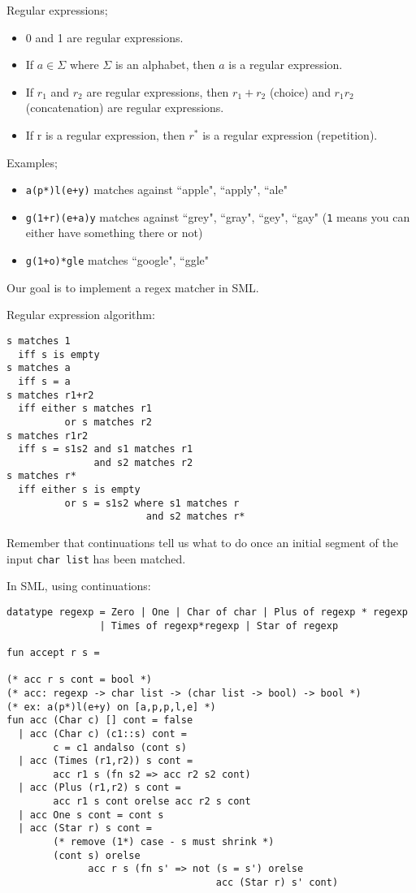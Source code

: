 \documentclass[11pt]{article}
\begin{document}
Regular expressions;
\begin{itemize}
    \item 0 and 1 are regular expressions.
    \item If $a \in \Sigma$ where $\Sigma$ is an alphabet, then $a$ is a regular expression.
    \item If $r_1$ and $r_2$ are regular expressions, then $r_1 + r_2$ (choice) and $r_{1}r_{2}$ (concatenation) are regular expressions.
    \item If r is a regular expression, then $r^*$ is a regular expression (repetition).
\end{itemize}

Examples;
\begin{itemize}
    \item \verb~a(p*)l(e+y)~ matches against ``apple", ``apply", ``ale"
    \item \verb~g(1+r)(e+a)y~ matches against ``grey", ``gray", ``gey", ``gay" (\verb~1~ means you can either have something there or not)
    \item \verb~g(1+o)*gle~ matches ``google", ``ggle"
\end{itemize}

Our goal is to implement a regex matcher in SML.

Regular expression algorithm:
\begin{verbatim}
s matches 1
  iff s is empty
s matches a
  iff s = a
s matches r1+r2
  iff either s matches r1
          or s matches r2
s matches r1r2
  iff s = s1s2 and s1 matches r1
               and s2 matches r2
s matches r*
  iff either s is empty
          or s = s1s2 where s1 matches r
                        and s2 matches r*
\end{verbatim}

Remember that continuations tell us what to do once an initial segment of the input \verb~char list~ has been matched.

In SML, using continuations:
\begin{verbatim}
datatype regexp = Zero | One | Char of char | Plus of regexp * regexp
                | Times of regexp*regexp | Star of regexp

fun accept r s = 

(* acc r s cont = bool *)
(* acc: regexp -> char list -> (char list -> bool) -> bool *)
(* ex: a(p*)l(e+y) on [a,p,p,l,e] *)
fun acc (Char c) [] cont = false
  | acc (Char c) (c1::s) cont = 
        c = c1 andalso (cont s)
  | acc (Times (r1,r2)) s cont =
        acc r1 s (fn s2 => acc r2 s2 cont)
  | acc (Plus (r1,r2) s cont =
        acc r1 s cont orelse acc r2 s cont
  | acc One s cont = cont s
  | acc (Star r) s cont = 
        (* remove (1*) case - s must shrink *)
        (cont s) orelse
              acc r s (fn s' => not (s = s') orelse 
                                    acc (Star r) s' cont)

\end{verbatim}
\end{document}
